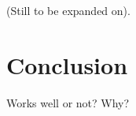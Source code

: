 (Still to be expanded on).

\setcounter{secnumdepth}{2}


\label{chapter:intro}

\label{chapter:literature}





\chapter{Conclusion}

Works well or not? Why?












